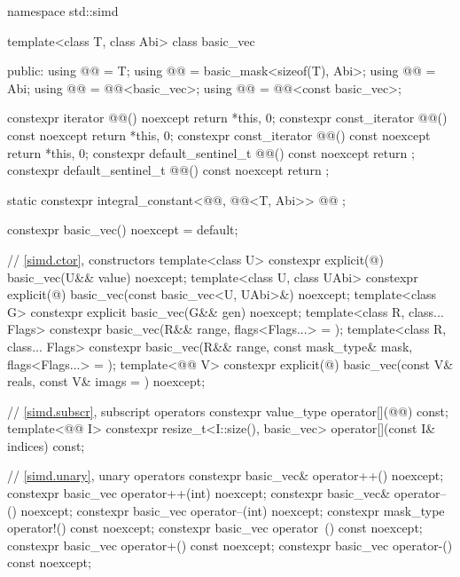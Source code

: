 %
\begin{codeblock}
namespace std::simd {
  template<class T, class Abi> class basic_vec {
  public:
    using @@ = T;
    using @@ = basic_mask<sizeof(T), Abi>;
    using @@ = Abi;
    using @@ = @@<basic_vec>;
    using @@ = @@<const basic_vec>;

    constexpr iterator @@() noexcept { return {*this, 0}; }
    constexpr const_iterator @@() const noexcept { return {*this, 0}; }
    constexpr const_iterator @@() const noexcept { return {*this, 0}; }
    constexpr default_sentinel_t @@() const noexcept { return {}; }
    constexpr default_sentinel_t @@() const noexcept { return {}; }

    static constexpr integral_constant<@@, @@<T, Abi>> @@ {};

    constexpr basic_vec() noexcept = default;

    // \ref{simd.ctor},  constructors
    template<class U>
      constexpr explicit(@\seebelow@) basic_vec(U&& value) noexcept;
    template<class U, class UAbi>
      constexpr explicit(@\seebelow@) basic_vec(const basic_vec<U, UAbi>&) noexcept;
    template<class G>
      constexpr explicit basic_vec(G&& gen) noexcept;
    template<class R, class... Flags>
      constexpr basic_vec(R&& range, flags<Flags...> = {});
    template<class R, class... Flags>
      constexpr basic_vec(R&& range, const mask_type& mask, flags<Flags...> = {});
    template<@@ V>
      constexpr explicit(@\seebelow@) basic_vec(const V& reals, const V& imags = {}) noexcept;

    // \ref{simd.subscr},  subscript operators
    constexpr value_type operator[](@@) const;
    template<@@ I>
      constexpr resize_t<I::size(), basic_vec> operator[](const I& indices) const;

    // \ref{simd.unary},  unary operators
    constexpr basic_vec& operator++() noexcept;
    constexpr basic_vec operator++(int) noexcept;
    constexpr basic_vec& operator--() noexcept;
    constexpr basic_vec operator--(int) noexcept;
    constexpr mask_type operator!() const noexcept;
    constexpr basic_vec operator~() const noexcept;
    constexpr basic_vec operator+() const noexcept;
    constexpr basic_vec operator-() const noexcept;

}}
\end{codeblock}
